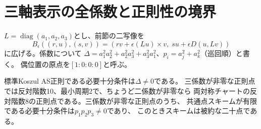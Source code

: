 \section{三軸表示の全係数と正則性の境界}
\label{sec:cross-product-parameters}
$L=\operatorname{diag}(a_1,a_2,a_3)$とし、前節の二写像を
\[
 B_\epsilon((r,u),(s,v))
   =(rv+\epsilon(Lu)\times v,\;su+\epsilon D(u,Lv))
\]
に広げる。係数について
$\Delta=a_1^2a_2^2+a_2^2a_3^2+a_3^2a_1^2$、$p_i=a_j^2+a_k^2$（巡回順）と書く。
偶位置の原点を$[1:0:0:0]$と呼ぶ。

\begin{theorem}[三軸族の全次数判定]\label{thm:cross-product-parameters}
標準Koszul AS正則である必要十分条件は$\Delta\ne0$である。
三係数が非零な正則点では反対階数10、最小周期2で、ちょうど二係数が非零なら
両対称チャートの反対階数8の正則点である。三係数が非零な正則点のうち、
共通点スキームが有限である必要十分条件は$p_1p_2p_3\ne0$であり、
このときスキームは被約な二十点である。
\end{theorem}

